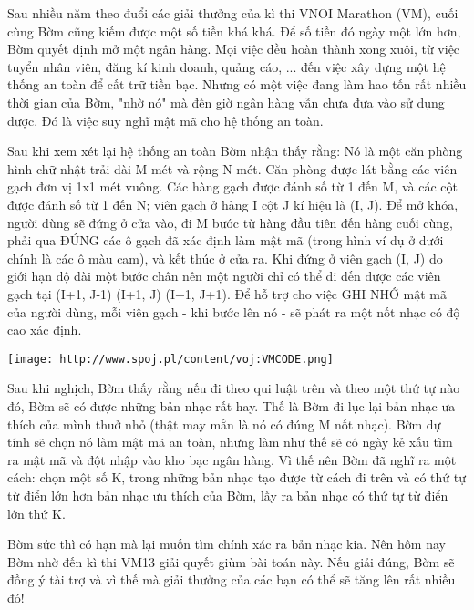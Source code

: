 Sau nhiều năm theo đuổi các giải thưởng của kì thi VNOI Marathon (VM), cuối cùng Bờm cũng kiếm được một số tiền khá khá. Để số tiền đó ngày một lớn hơn, Bờm quyết định mở một ngân hàng. Mọi việc đều hoàn thành xong xuôi, từ việc tuyển nhân viên, đăng kí kinh doanh, quảng cáo, ... đến việc xây dựng một hệ thống an toàn để cất trữ tiền bạc. Nhưng có một việc đang làm hao tốn rất nhiều thời gian của Bờm, "nhờ nó" mà đến giờ ngân hàng vẫn chưa đưa vào sử dụng được. Đó là việc suy nghĩ mật mã cho hệ thống an toàn.  

   Sau khi xem xét lại hệ thống an toàn Bờm nhận thấy rằng: Nó là một căn phòng hình chữ nhật trải dài M mét và rộng N mét. Căn phòng được lát bằng các viên gạch đơn vị 1x1 mét vuông. Các hàng gạch được đánh số từ 1 đến M, và các cột được đánh số từ 1 đến N; viên gạch ở hàng I cột J kí hiệu là (I, J). Để mở khóa, người dùng sẽ đứng ở cửa vào, đi M bước từ hàng đầu tiên đến hàng cuối cùng, phải qua ĐÚNG các ô gạch đã xác định làm mật mã (trong hình ví dụ ở dưới chính là các ô màu cam), và kết thúc ở cửa ra. Khi đứng ở viên gạch (I, J) do giới hạn độ dài một bước chân nên một người chỉ có thể đi đến được các viên gạch tại (I+1, J-1) (I+1, J) (I+1, J+1). Để hỗ trợ cho việc GHI NHỚ mật mã của người dùng, mỗi viên gạch - khi bước lên nó - sẽ phát ra một nốt nhạc có độ cao xác định.  


\texttt{[image: http://www.spoj.pl/content/voj:VMCODE.png]}

   Sau khi nghịch, Bờm thấy rằng nếu đi theo qui luật trên và theo một thứ tự nào đó, Bờm sẽ có được những bản nhạc rất hay. Thế là Bờm đi lục lại bản nhạc ưa thích của mình thuở nhỏ (thật may mắn là nó có đúng M nốt nhạc). Bờm dự tính sẽ chọn nó làm mật mã an toàn, nhưng làm như thế sẽ có ngày kẻ xấu tìm ra mật mã và đột nhập vào kho bạc ngân hàng. Vì thế nên Bờm đã nghĩ ra một cách: chọn một số K, trong những bản nhạc tạo được từ cách đi trên và có thứ tự từ điển lớn hơn bản nhạc ưu thích của Bờm, lấy ra bản nhạc có thứ tự từ điển lớn thứ K.  

   Bờm sức thì có hạn mà lại muốn tìm chính xác ra bản nhạc kia. Nên hôm nay Bờm nhờ đến kì thi VM13 giải quyết giùm bài toán này. Nếu giải đúng, Bờm sẽ đồng ý tài trợ và vì thế mà giải thưởng của các bạn có thể sẽ tăng lên rất nhiều đó!